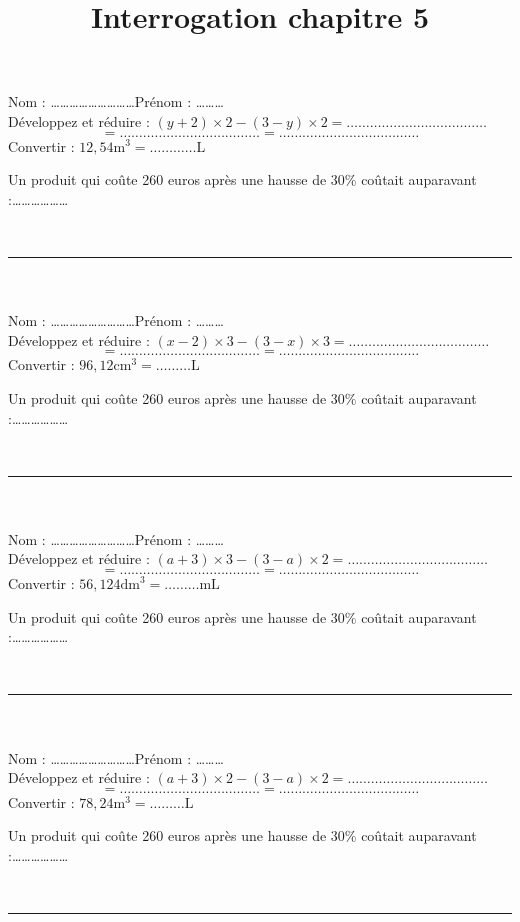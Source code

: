 \documentclass[14 pt, fleqn]{extarticle}
\title{Interrogation chapitre 5}
\date{}
\theoremstyle{plain}
\begin{document}
	

\baselineskip


 Nom : \ldots\ldots\ldots\ldots\ldots\ldots\ldots\ldots\ldots Prénom : \ldots\ldots\ldots \\ 
Développez et réduire :
 \( (y+2)\times 2 - (3 - y) \times 2 =\ldots\ldots\ldots\ldots\ldots\ldots\ldots\ldots\ldots\ldots\ldots\ldots \)
 \[ = \ldots\ldots\ldots\ldots\ldots\ldots\ldots\ldots\ldots\ldots\ldots\ldots = \ldots\ldots\ldots\ldots\ldots\ldots\ldots\ldots\ldots\ldots\ldots\ldots\]
 Convertir : 
 \( 12,54 \text{m}^3 = \ldots\ldots\ldots\ldots \text{L}\)
 
Un produit qui coûte 260 euros après une hausse de $30\%$ coûtait auparavant  :\ldots\ldots\ldots\ldots\ldots\ldots 
 
 \ \\  
 \hrule
 \ \\ \ \\
 Nom : \ldots\ldots\ldots\ldots\ldots\ldots\ldots\ldots\ldots Prénom : \ldots\ldots\ldots \\ 
Développez et réduire :
\((x-2)\times 3 - (3 - x) \times 3 =\ldots\ldots\ldots\ldots\ldots\ldots\ldots\ldots\ldots\ldots\ldots\ldots \)
 \[ = \ldots\ldots\ldots\ldots\ldots\ldots\ldots\ldots\ldots\ldots\ldots\ldots = \ldots\ldots\ldots\ldots\ldots\ldots\ldots\ldots\ldots\ldots\ldots\ldots\]
 Convertir : 
 \( 96,12\text{cm}^3 = \ldots\ldots\ldots \text{L}\)
 
Un produit qui coûte 260 euros après une hausse de $30\%$ coûtait auparavant  :\ldots\ldots\ldots\ldots\ldots\ldots 
 
 \ \\  
 
 \hrule
 \ \\ \ \\
 Nom : \ldots\ldots\ldots\ldots\ldots\ldots\ldots\ldots\ldots Prénom : \ldots\ldots\ldots \\ 
Développez et réduire :
 \( (a+3)\times 3 - (3- a) \times 2  =\ldots\ldots\ldots\ldots\ldots\ldots\ldots\ldots\ldots\ldots\ldots\ldots \)
 \[ = \ldots\ldots\ldots\ldots\ldots\ldots\ldots\ldots\ldots\ldots\ldots\ldots = \ldots\ldots\ldots\ldots\ldots\ldots\ldots\ldots\ldots\ldots\ldots\ldots\]
 Convertir : 
 \( 56,124 \text{dm}^3 = \ldots\ldots\ldots \text{mL}\)
 
Un produit qui coûte 260 euros après une hausse de $30\%$ coûtait auparavant  :\ldots\ldots\ldots\ldots\ldots\ldots 
 
 \ \\ 
 \hrule
 \ \\ \ \\
 Nom : \ldots\ldots\ldots\ldots\ldots\ldots\ldots\ldots\ldots Prénom : \ldots\ldots\ldots \\ 
Développez et réduire :
 \( (a+3)\times 2 - (3 - a) \times 2  =\ldots\ldots\ldots\ldots\ldots\ldots\ldots\ldots\ldots\ldots\ldots\ldots \)
 \[ = \ldots\ldots\ldots\ldots\ldots\ldots\ldots\ldots\ldots\ldots\ldots\ldots = \ldots\ldots\ldots\ldots\ldots\ldots\ldots\ldots\ldots\ldots\ldots\ldots\]
 Convertir : 
 \( 78,24 \text{m}^3 = \ldots\ldots\ldots \text{L}\)
 
Un produit qui coûte 260 euros après une hausse de $30\%$ coûtait auparavant  :\ldots\ldots\ldots\ldots\ldots\ldots 
 
 \ \\  
 \hrule
 
 
 
 	
\end{document}
